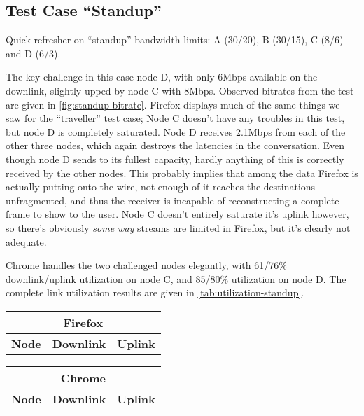 \subsection{Test Case ``Standup''}

Quick refresher on ``standup'' bandwidth limits: A (30/20), B (30/15), C (8/6) and D (6/3).

The key challenge in this case node D, with only 6Mbps available on the downlink, slightly upped by node C with 8Mbps. Observed bitrates from the test are given in \autoref{fig:standup-bitrate}. Firefox displays much of the same things we saw for the ``traveller'' test case; Node C doesn't have any troubles in this test, but node D is completely saturated. Node D receives 2.1Mbps from each of the other three nodes, which again destroys the latencies in the conversation. Even though node D sends to its fullest capacity, hardly anything of this is correctly received by the other nodes. This probably implies that among the data Firefox is actually putting onto the wire, not enough of it reaches the destinations unfragmented, and thus the receiver is incapable of reconstructing a complete frame to show to the user. Node C doesn't entirely saturate it's uplink however, so there's obviously \emph{some way} streams are limited in Firefox, but it's clearly not adequate.

Chrome handles the two challenged nodes elegantly, with 61/76\% downlink/uplink utilization on node C, and 85/80\% utilization on node D. The complete link utilization results are given in \autoref{tab:utilization-standup}.

\begin{center}
    \label{tab:utilization-standup}
    \begin{tabular}{| l | l | l |}
    \multicolumn{3}{c}{\textbf{Firefox}} \\ \hline
    \textbf{Node} & \textbf{Downlink} & \textbf{Uplink} \\ \hline
    
    \hline
    \end{tabular}
    \begin{tabular}{| l | l | l |}
    \multicolumn{3}{c}{\textbf{Chrome}} \\ \hline
    \textbf{Node} & \textbf{Downlink} & \textbf{Uplink} \\ \hline
    
    \hline
    \end{tabular}
\end{center}

